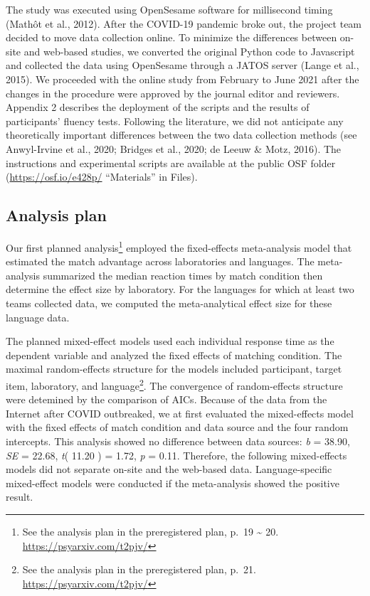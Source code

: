 \documentclass[
  man]{apa7}
\begin{document}
The study was executed using OpenSesame software for millisecond timing (Mathôt et al., 2012). After the COVID-19 pandemic broke out, the project team decided to move data collection online. To minimize the differences between on-site and web-based studies, we converted the original Python code to Javascript and collected the data using OpenSesame through a JATOS server (Lange et al., 2015). We proceeded with the online study from February to June 2021 after the changes in the procedure were approved by the journal editor and reviewers. Appendix 2 describes the deployment of the scripts and the results of participants' fluency tests. Following the literature, we did not anticipate any theoretically important differences between the two data collection methods (see Anwyl-Irvine et al., 2020; Bridges et al., 2020; de Leeuw \& Motz, 2016). The instructions and experimental scripts are available at the public OSF folder (\url{https://osf.io/e428p/} ``Materials'' in Files).

\hypertarget{analysis-plan}{%
\subsection{Analysis plan}\label{analysis-plan}}

Our first planned analysis\footnote{See the analysis plan in the preregistered plan, p.~19 \textasciitilde{} 20. \url{https://psyarxiv.com/t2pjv/}} employed the fixed-effects meta-analysis model that estimated the match advantage across laboratories and languages. The meta-analysis summarized the median reaction times by match condition then determine the effect size by laboratory. For the languages for which at least two teams collected data, we computed the meta-analytical effect size for these language data.

The planned mixed-effect models used each individual response time as the dependent variable and analyzed the fixed effects of matching condition. The maximal random-effects structure for the models included participant, target item, laboratory, and language\footnote{See the analysis plan in the preregistered plan, p.~21. \url{https://psyarxiv.com/t2pjv/}}. The convergence of random-effects structure were detemined by the comparison of AICs. Because of the data from the Internet after COVID outbreaked, we at first evaluated the mixed-effects model with the fixed effects of match condition and data source and the four random intercepts. This analysis showed no difference between data sources: \emph{b} = 38.90, \emph{SE} = 22.68, \emph{t}( 11.20 ) = 1.72, \emph{p} = 0.11. Therefore, the following mixed-effects models did not separate on-site and the web-based data. Language-specific mixed-effect models were conducted if the meta-analysis showed the positive result.
\end{document}
